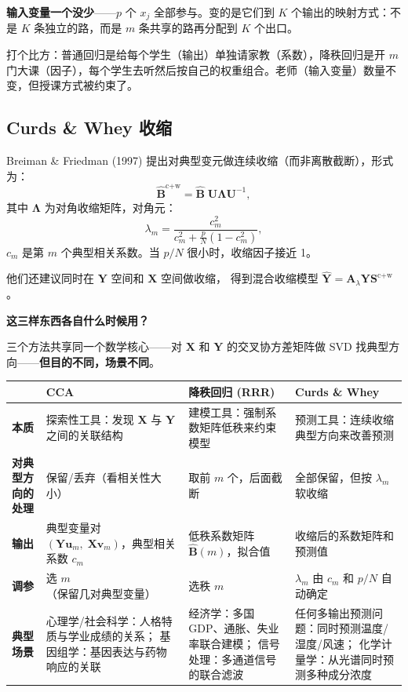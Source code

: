 \textbf{输入变量一个没少}——$p$ 个 $x_j$ 全部参与。变的是它们到 $K$ 个输出的映射方式：不是 $K$ 条独立的路，而是 $m$ 条共享的路再分配到 $K$ 个出口。

打个比方：普通回归是给每个学生（输出）单独请家教（系数），降秩回归是开 $m$ 门大课（因子），每个学生去听然后按自己的权重组合。老师（输入变量）数量不变，但授课方式被约束了。

\subsection{Curds \& Whey 收缩}

Breiman \& Friedman (1997) 提出对典型变元做连续收缩（而非离散截断），形式为：
\[
    \hat{\mathbf{B}}^{\text{c+w}} = \hat{\mathbf{B}} \; \mathbf{U} \bm{\Lambda} \mathbf{U}^{-1},
\]
其中 $\bm{\Lambda}$ 为对角收缩矩阵，对角元：
\[
    \lambda_m = \frac{c_m^2}{c_m^2 + \frac{p}{N}(1 - c_m^2)},
\]
$c_m$ 是第 $m$ 个典型相关系数。当 $p/N$ 很小时，收缩因子接近 1。

他们还建议同时在 $\mathbf{Y}$ 空间和 $\mathbf{X}$ 空间做收缩，
得到混合收缩模型 $\hat{\mathbf{Y}} = \mathbf{A}_\lambda \mathbf{Y} \mathbf{S}^{\text{c+w}}$。

\medskip
\noindent
\textbf{这三样东西各自什么时候用？}

三个方法共享同一个数学核心——对 $\mathbf{X}$ 和 $\mathbf{Y}$ 的交叉协方差矩阵做 SVD 找典型方向——\textbf{但目的不同，场景不同}。

\begin{center}
\renewcommand{\arraystretch}{1.5}
\begin{tabular}{p{3cm}|p{4.5cm}|p{4.5cm}|p{4.5cm}}
\toprule
& \textbf{CCA} & \textbf{降秩回归 (RRR)} & \textbf{Curds \& Whey} \\
\midrule
\textbf{本质}    & 探索性工具：发现 $\mathbf{X}$ 与 $\mathbf{Y}$ 之间的关联结构
                   & 建模工具：强制系数矩阵低秩来约束模型
                   & 预测工具：连续收缩典型方向来改善预测 \\
\midrule
\textbf{对典型方向的处理} & 保留/丢弃（看相关性大小）
                   & 取前 $m$ 个，后面截断
                   & 全部保留，但按 $\lambda_m$ 软收缩 \\
\midrule
\textbf{输出}     & 典型变量对 $(\mathbf{Y}\mathbf{u}_m,\; \mathbf{X}\mathbf{v}_m)$，典型相关系数 $c_m$
                   & 低秩系数矩阵 $\hat{\mathbf{B}}(m)$，拟合值
                   & 收缩后的系数矩阵和预测值 \\
\midrule
\textbf{调参}     & 选 $m$（保留几对典型变量）
                   & 选秩 $m$
                   & $\lambda_m$ 由 $c_m$ 和 $p/N$ 自动确定 \\
\midrule
\textbf{典型场景} & 心理学/社会科学：人格特质与学业成绩的关系；
                   基因组学：基因表达与药物响应的关联
                   & 经济学：多国 GDP、通胀、失业率联合建模；
                   信号处理：多通道信号的联合滤波
                   & 任何多输出预测问题：同时预测温度/湿度/风速；
                   化学计量学：从光谱同时预测多种成分浓度 \\
\bottomrule
\end{tabular}
\end{center}

